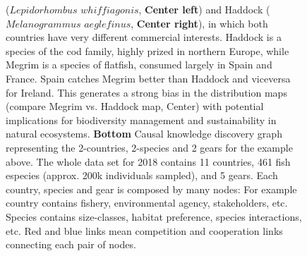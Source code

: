 \documentclass[11pt, a4paper]{article} %
\begin{document}
\begin{figure}[h!]
\begin{center}
{       ($Lepidorhombus$ $whiffiagonis$, {\bf Center left}) and Haddock
       ($Melanogrammus$ $aeglefinus$, {\bf Center right}), in which
       both countries have very different commercial
       interests. Haddock is a species of the cod family, highly
       prized in northern Europe, while Megrim is a species of
       flatfish, consumed largely in Spain and France. Spain catches
       Megrim better than Haddock and viceversa for Ireland. This
       generates a strong bias in the distribution maps (compare
       Megrim vs. Haddock map, Center) with potential implications for
       biodiversity management and sustainability in natural
       ecosystems. {\bf Bottom} Causal knowledge discovery graph
       representing the 2-countries, 2-species and 2 gears for the
       example above. The whole data set for 2018 contains 11
       countries, 461 fish especies (approx. 200k individuals
       sampled), and 5 gears. Each country, species and gear is
       composed by many nodes: For example country contains fishery,
       environmental agency, stakeholders, etc. Species contains
       size-classes, habitat preference, species interactions,
       etc. Red and blue links mean competition and cooperation links
       connecting each pair of nodes.}
\end{center}
  \end{figure}
\end{document}
